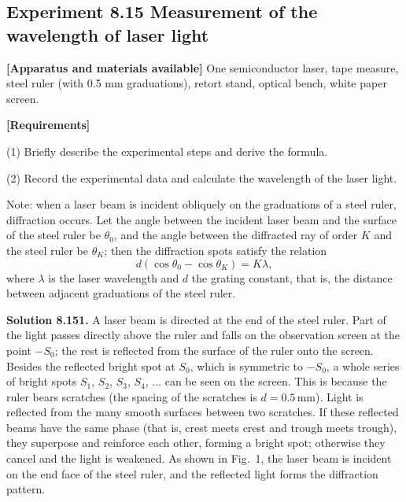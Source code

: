 \subsection*{Experiment 8.15 \quad Measurement of the wavelength of laser light}

\textbf{[Apparatus and materials available]} One semiconductor laser, tape measure, steel ruler (with 0.5 mm graduations), retort stand, optical bench, white paper screen.

\textbf{[Requirements]}

(1) Briefly describe the experimental steps and derive the formula.

(2) Record the experimental data and calculate the wavelength of the laser light.

Note: when a laser beam is incident obliquely on the graduations of a steel ruler, diffraction occurs. Let the angle between the incident laser beam and the surface of the steel ruler be $\theta_0$, and the angle between the diffracted ray of order $K$ and the steel ruler be $\theta_K$; then the diffraction spots satisfy the relation
\[
d(\cos\theta_0-\cos\theta_K)=K\lambda,
\]
where $\lambda$ is the laser wavelength and $d$ the grating constant, that is, the distance between adjacent graduations of the steel ruler.

\textbf{Solution 8.15}\quad \textbf{1.} A laser beam is directed at the end of the steel ruler. Part of the light passes directly above the ruler and falls on the observation screen at the point $-S_0$; the rest is reflected from the surface of the ruler onto the screen. Besides the reflected bright spot at $S_0$, which is symmetric to $-S_0$, a whole series of bright spots $S_1$, $S_2$, $S_3$, $S_4$, $\ldots$ can be seen on the screen. This is because the ruler bears scratches (the spacing of the scratches is $d=0.5\,\mathrm{mm}$). Light is reflected from the many smooth surfaces between two scratches. If these reflected beams have the same phase (that is, crest meets crest and trough meets trough), they superpose and reinforce each other, forming a bright spot; otherwise they cancel and the light is weakened. As shown in Fig.~1, the laser beam is incident on the end face of the steel ruler, and the reflected light forms the diffraction pattern.

